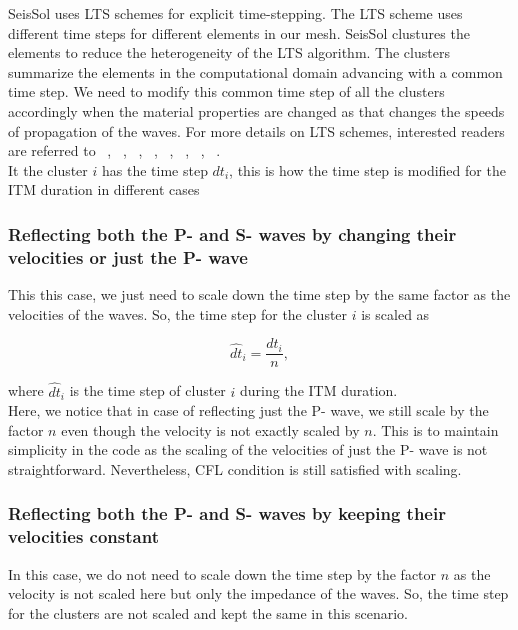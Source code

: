 SeisSol uses \ac{LTS} schemes for explicit time-stepping. The \ac{LTS} scheme uses different time steps for different elements in our mesh. 
SeisSol clustures the elements to reduce the heterogeneity of the \ac{LTS} algorithm. The clusters summarize the elements in the computational domain advancing
with a common time step. We need to modify this common time step of all the clusters accordingly when the material properties are changed as that changes the 
speeds of propagation of the waves. For more details on \ac{LTS} schemes, interested readers are referred to ~\parencite{breuer}, ~\parencite{dumbser2007arbitrary},
~\parencite{castro2009space}, ~\parencite{rietmann2015loadbalanced}, ~\parencite{seny2014efficient}, ~\parencite{Gassner2008}, ~\parencite{andrew}, 
~\parencite{SCHLEGEL2009345}. \\

It the cluster $i$ has the time step $dt_i$, this is how the time step is modified for the \ac{ITM} duration in different cases

\subsubsection{Reflecting both the P- and S- waves by changing their velocities or just the P- wave}
This this case, we just need to scale down the time step by the same factor as the velocities of the waves. So, the time step for the cluster $i$ is scaled as

\begin{equation}
    \hat{dt}_i = \frac{dt_i}{n} ,
\end{equation}

where $\hat{dt}_i$ is the time step of cluster $i$ during the \ac{ITM} duration. \\

Here, we notice that in case of reflecting just the P- wave, we still scale by the factor $n$ even though the velocity is not exactly scaled by $n$. This is
to maintain simplicity in the code as the scaling of the velocities of just the P- wave is not straightforward. Nevertheless, \ac{CFL} condition is still 
satisfied with scaling. \\

\subsubsection{Reflecting both the P- and S- waves by keeping their velocities constant}
In this case, we do not need to scale down the time step by the factor $n$ as the velocity is not scaled here but only the impedance of the waves. 
So, the time step for the clusters are not scaled and kept the same in this scenario.

